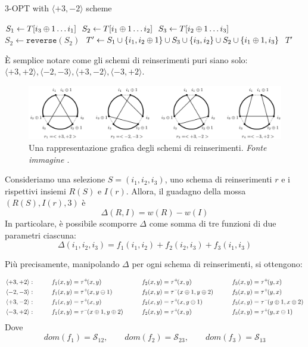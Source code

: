 \begin{algorithm}
\caption{$3$-OPT with $\langle +3,-2 \rangle$ scheme}
\begin{algorithmic}[1]
    \State $S_1 \gets T[i_3 \oplus 1 \dots i_1]$
    \State $S_2 \gets T[i_1 \oplus 1 \dots i_2]$
    \State $S_3 \gets T[i_2 \oplus 1 \dots i_3]$
    \State $S_2 \gets \texttt{reverse}(S_2)$
    \State
    \State $T' \gets S_1 \cup \{i_1, i_2 \oplus 1\} \cup S_3 \cup \{i_3, i_2\} \cup S_2 \cup \{i_1 \oplus 1, i_3\}$
    \State \Return $T'$
\EndFunction
\end{algorithmic}
\end{algorithm}
\noindent
È semplice notare come gli schemi di reinserimenti puri siano solo:
$\langle+3,+2\rangle, \langle-2,-3\rangle, \langle+3,-2\rangle, \langle-3,+2\rangle$.\\

\begin{figure}[H]
    \centering
    \includegraphics[width=400pt]{img/reinsertionSchemes.png}
    \caption{Una rappresentazione grafica degli schemi di reinserimenti. \textit{Fonte immagine \cite{3opt}}.}
\end{figure}

Consideriamo una selezione $S = (i_1, i_2, i_3)$, uno schema di reinserimenti $r$ e i rispettivi insiemi
$R(S)$ e $I(r)$. Allora, il guadagno della mossa $(R(S), I(r), 3)$ è $$\Delta{}(R, I) = w(R) - w(I)$$
In particolare, è possibile scomporre $\Delta$ come somma di tre funzioni di due parametri ciascuna:
$$\Delta{}(i_1,i_2,i_3) = f_1(i_1, i_2) + f_2(i_2, i_3) + f_3(i_1, i_3)$$

\newpage
Più precisamente, manipolando $\Delta$ per ogni schema di reinserimenti, si ottengono:


\begin{alignat*}{5}
    \langle+3,+2\rangle:& \qquad &f_1(x,y) &= \taup{x}{y} \qquad &f_2(x,y) &= \taup{x}{y} \qquad &f_3(x,y) &= \taup{y}{x} \\
    \langle-2,-3\rangle:& \qquad &f_1(x,y) &= \taup{x}{y\mns{}1} \qquad &f_2(x,y) &= \taum{x\pls{}1}{y\pls{}2} \qquad &f_3(x,y) &= \taup{y}{x} \\
    \langle+3,-2\rangle:& \qquad &f_1(x,y) &= \taup{x}{y} \qquad &f_2(x,y) &= \taup{x}{y\mns{}1} \qquad &f_3(x,y) &= \taum{y\pls{}1}{x\pls{}2} \\
    \langle-3,+2\rangle:& \qquad &f_1(x,y) &= \taum{x\pls{}1}{y\pls{}2} \qquad &f_2(x,y) &= \taup{x}{y} \qquad &f_3(x,y) &= \taup{y}{x\mns{}1} \\
\end{alignat*}
Dove $$dom(f_1) = \mathcal{S}_{12}, \qquad dom(f_2) = \mathcal{S}_{23}, \qquad dom(f_3) = \mathcal{S}_{13}$$

